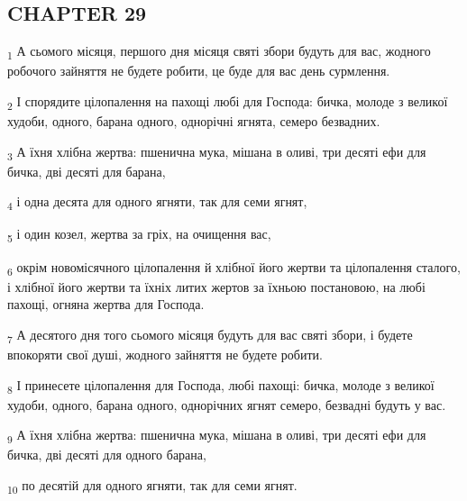 \subsection{CHAPTER 29}
\begin{tcolorbox}
\textsubscript{1} А сьомого місяця, першого дня місяця святі збори будуть для вас, жодного робочого зайняття не будете робити, це буде для вас день сурмлення.
\end{tcolorbox}
\begin{tcolorbox}
\textsubscript{2} І спорядите цілопалення на пахощі любі для Господа: бичка, молоде з великої худоби, одного, барана одного, однорічні ягнята, семеро безвадних.
\end{tcolorbox}
\begin{tcolorbox}
\textsubscript{3} А їхня хлібна жертва: пшенична мука, мішана в оливі, три десяті ефи для бичка, дві десяті для барана,
\end{tcolorbox}
\begin{tcolorbox}
\textsubscript{4} і одна десята для одного ягняти, так для семи ягнят,
\end{tcolorbox}
\begin{tcolorbox}
\textsubscript{5} і один козел, жертва за гріх, на очищення вас,
\end{tcolorbox}
\begin{tcolorbox}
\textsubscript{6} окрім новомісячного цілопалення й хлібної його жертви та цілопалення сталого, і хлібної його жертви та їхніх литих жертов за їхньою постановою, на любі пахощі, огняна жертва для Господа.
\end{tcolorbox}
\begin{tcolorbox}
\textsubscript{7} А десятого дня того сьомого місяця будуть для вас святі збори, і будете впокоряти свої душі, жодного зайняття не будете робити.
\end{tcolorbox}
\begin{tcolorbox}
\textsubscript{8} І принесете цілопалення для Господа, любі пахощі: бичка, молоде з великої худоби, одного, барана одного, однорічних ягнят семеро, безвадні будуть у вас.
\end{tcolorbox}
\begin{tcolorbox}
\textsubscript{9} А їхня хлібна жертва: пшенична мука, мішана в оливі, три десяті ефи для бичка, дві десяті для одного барана,
\end{tcolorbox}
\begin{tcolorbox}
\textsubscript{10} по десятій для одного ягняти, так для семи ягнят.
\end{tcolorbox}
